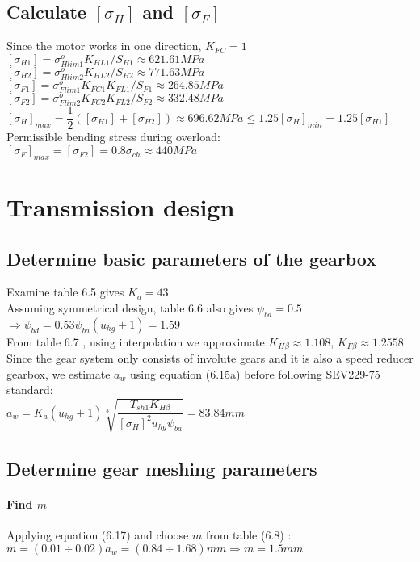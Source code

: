 \subsection{Calculate $ [\sigma_H] $ and $ [\sigma_F] $}
Since the motor works in one direction, $ K_{FC} = 1$\\
$ [\sigma_{H1}] = \sigma_{Hlim1}^oK_{HL1}/S_{H1} \approx 621.61\unit{MPa}$\\
$ [\sigma_{H2}] = \sigma_{Hlim2}^oK_{HL2}/S_{H2} \approx 771.63\unit{MPa}$\\
$ [\sigma_{F1}] = \sigma_{Flim1}^oK_{FC1}K_{FL1}/S_{F1} \approx 264.85\unit{MPa}$\\
$ [\sigma_{F2}] = \sigma_{Flim2}^oK_{FC2}K_{FL2}/S_{F2} \approx 332.48\unit{MPa}$\\
$ [\sigma_H]_{max} = \dfrac{1}{2}\left( [\sigma_{H1}]+[\sigma_{H2}]\right)  \approx 696.62\unit{MPa}\leq 1.25[\sigma_H]_{min} = 1.25[\sigma_{H1}]$\\
Permissible bending stress during overload:\\
$ [\sigma_F]_{max} = [\sigma_{F2}] = 0.8\sigma_{ch} \approx 440\unit{MPa} $
\section{Transmission design}
\subsection{Determine basic parameters of the gearbox}
Examine table 6.5  gives $ K_a = 43 $\\
Assuming symmetrical design, table 6.6  also gives $ \psi_{ba} = 0.5$\\
$ \Rightarrow \psi_{bd} = 0.53\psi_{ba}(u_{hg}+1) = 1.59$\\
From table 6.7 , using interpolation we approximate $ K_{H\beta} \approx 1.108 $, $ K_{F\beta} \approx 1.2558 $\\
Since the gear system only consists of involute gears and it is also a speed reducer gearbox, we estimate $ a_w $ using equation (6.15a)  before following SEV229-75 standard:\\
$ a_{w} = K_a(u_{hg}+1)\sqrt[3]{\dfrac{T_{sh1}K_{H\beta}}{[\sigma_H]^2u_{hg}\psi_{ba}}} = 83.84\unit{mm}$
\subsection{Determine gear meshing parameters}
\paragraph{Find $ m $} Applying equation (6.17)  and choose $ m $ from table (6.8) :\\
$ m = (0.01\div0.02)a_w = (0.84\div1.68) \unit{mm} \Rightarrow m=1.5\unit{mm}$
